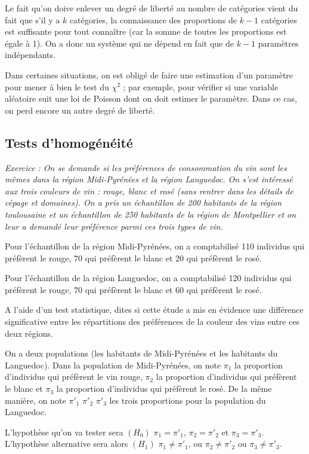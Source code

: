 \documentclass[12pt, a4paper]{book}
\numberwithin{equation}{section}
\begin{document}
Le fait qu'on doive enlever un degré de liberté au nombre de catégories vient du fait que s'il y a $k$
catégories, la connaissance des proportions de $k-1$ catégories est suffisante pour tout connaître (car la 
somme de toutes les proportions est égale à 1). On a donc un système qui ne dépend en fait que de $k-1$
paramètres indépendants.

Dans certaines situations, on est obligé de faire une estimation d'un paramètre pour mener à bien le test du $\chi^2$ ; par exemple, pour vérifier si une variable aléatoire suit une loi de Poisson dont on doit estimer le paramètre. Dans ce cas, on perd encore un autre degré de liberté.


\subsection{Tests d'homogénéité} 

{\it Exercice : On se demande si les préférences de consommation du vin sont les mêmes dans la région
Midi-Pyrénées et la région Languedoc. On s'est intéressé aux trois couleurs de vin : rouge, blanc et rosé 
(sans rentrer dans les détails de cépage et domaines).
On a pris un échantillon de 200 habitants de la région toulousaine et un échantillon de 250 habitants de la région de Montpellier et on leur a demandé leur préférence parmi ces trois types de vin. 

Pour l'échantillon de la région Midi-Pyrénées, on a comptabilisé 110 individus qui préfèrent le rouge, 
70 qui préfèrent le blanc et 20 qui préfèrent le rosé.

Pour l'échantillon de la région Languedoc, on a comptabilisé 120 individus qui préfèrent le rouge, 
70 qui préfèrent le blanc et 60 qui préfèrent le rosé.

A l'aide d'un test statistique, dites si cette étude a mis en évidence une différence significative 
entre les répartitions des 
préférences de la couleur des vins entre ces deux régions.\\
}

On a deux populations (les habitants de Midi-Pyrénées et les habitants du Languedoc). 
Dans la population de Midi-Pyrénées, on note $\pi_1$ la proportion d'individus qui préfèrent le vin rouge,
$\pi_2$ la proportion d'individus qui préfèrent le blanc et 
$\pi_3$ la proportion d'individus qui préfèrent le rosé.
De la même manière, on note $\pi'_1$ $\pi'_2$ $\pi'_3$ les trois proportions pour la population du Languedoc.

L'hypothèse qu'on va tester sera $(H_0)$ $\pi_1=\pi'_1$, $\pi_2=\pi'_2$ et $\pi_3=\pi'_3$.
L'hypothèse alternative sera alors  $(H_1)$ $\pi_1\neq\pi'_1$, ou $\pi_2\neq\pi'_2$ ou $\pi_3\neq\pi'_3$.
\end{document}
